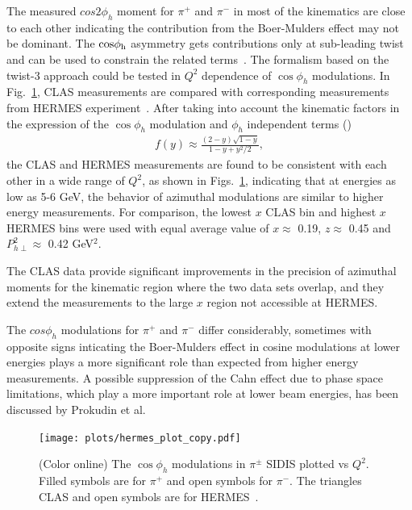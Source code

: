 \documentclass[aps,prl,twocolumn,showpacs,superscriptaddress,groupedaddress]{revtex4}  %
\newcommand{\Phperp}{P_{h\perp}}
\newcommand{\xbj}{x}
\begin{document}
The measured $cos 2 \phi_h$ moment for $\pi^+$ and $\pi^-$ in most of the kinematics are close to each other indicating the contribution from the Boer-Mulders effect may not be dominant.
The $\rm cos \phi_h$ asymmetry gets contributions only at sub-leading twist and can be used to constrain the related terms~\cite{Cahn:1978se,Anselmino:2005nn,Berger:1979xz}.
The formalism based on the twist-3 approach could be tested in $Q^2$ dependence of $\cos\phi_h$ modulations.  In Fig.~\ref{fig:clas-hermes}, CLAS measurements are compared with corresponding measurements from HERMES experiment~\cite{Airapetian:2012yg}.
After taking into account the kinematic factors in the expression
of the $\cos\phi_h$ modulation and $\phi_h$ independent terms (\cite{Bacchetta:2006tn})
\begin{eqnarray}
f(y)\approx \frac{(2-y)\sqrt{1-y}}{1-y+y^{2}/2} ,
\label{fy}
\end{eqnarray}
the CLAS and HERMES measurements are found to 
be consistent with each other in a wide range of $Q^2$, as shown in Figs.~\ref{fig:clas-hermes}, indicating that at energies as low as 5-6 GeV, the
behavior of azimuthal modulations are similar to higher energy measurements. 
For comparison, the lowest $\xbj$ CLAS bin and highest $\xbj$ HERMES bins were used with equal average value of $\xbj\approx$ 0.19, $z\approx$ 0.45 and $\Phperp^2 \approx$ 0.42 GeV$^2$.

The CLAS data provide significant improvements in the precision of azimuthal moments for the kinematic region where the two data sets overlap, and they extend the measurements to the large $\xbj$ region not accessible at HERMES.

The $cos \phi_h$ modulations for $\pi^+$ and $\pi^-$ differ considerably, sometimes with opposite signs inticating the Boer-Mulders effect in cosine modulations at lower energies plays a more significant role than expected from higher energy measurements.
A possible suppression of the Cahn effect due to phase space limitations, which play a more important role at lower beam energies, has been discussed by Prokudin et al.
\begin{figure}[h]
\begin{center}
\texttt{[image: plots/hermes\_plot\_copy.pdf]}
\end{center}
\caption{(Color online) The $\cos\phi_h$ modulations in $\pi^\pm$ SIDIS plotted vs $Q^2$. Filled symbols are for $\pi^+$ and open symbols for $\pi^-$.
The triangles CLAS and open symbols are for HERMES~\cite{Airapetian:2012yg}.}
\label{fig:clas-hermes}
\end{figure}
\end{document}
